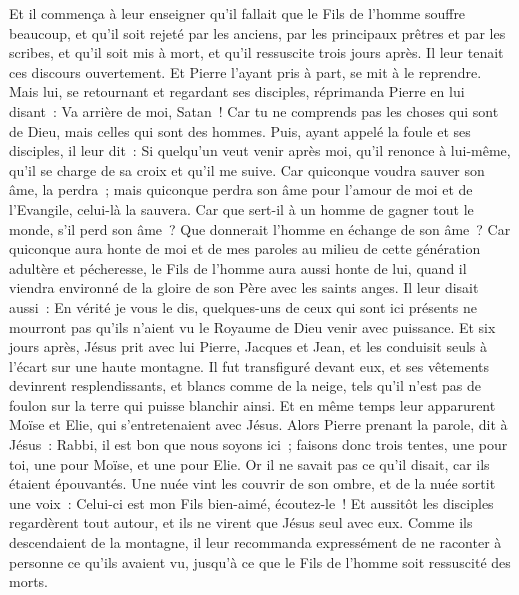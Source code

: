 \begin{multicols}{2}
Et il commença à leur enseigner qu'il fallait que le Fils de l'homme souffre beaucoup, et qu'il soit rejeté par les anciens, par les principaux prêtres et par les scribes, et qu'il soit mis à mort, et qu'il ressuscite trois jours après.
Il leur tenait ces discours ouvertement. Et Pierre l'ayant pris à part, se mit à le reprendre.
Mais lui, se retournant et regardant ses disciples, réprimanda Pierre en lui disant~: Va arrière de moi, Satan~! Car tu ne comprends pas les choses qui sont de Dieu, mais celles qui sont des hommes.
Puis, ayant appelé la foule et ses disciples, il leur dit~: Si quelqu'un veut venir après moi, qu'il renonce à lui-même, qu'il se charge de sa croix et qu'il me suive.
Car quiconque voudra sauver son âme, la perdra~; mais quiconque perdra son âme pour l'amour de moi et de l'Evangile, celui-là la sauvera.
Car que sert-il à un homme de gagner tout le monde, s'il perd son âme~?
Que donnerait l'homme en échange de son âme~?
Car quiconque aura honte de moi et de mes paroles au milieu de cette génération adultère et pécheresse, le Fils de l'homme aura aussi honte de lui, quand il viendra environné de la gloire de son Père avec les saints anges.
\VerseOne{}Il leur disait aussi~: En vérité je vous le dis, quelques-uns de ceux qui sont ici présents ne mourront pas qu'ils n'aient vu le Royaume de Dieu venir avec puissance.
Et six jours après, Jésus prit avec lui Pierre, Jacques et Jean, et les conduisit seuls à l'écart sur une haute montagne. Il fut transfiguré devant eux,
et ses vêtements devinrent resplendissants, et blancs comme de la neige, tels qu'il n'est pas de foulon sur la terre qui puisse blanchir ainsi.
Et en même temps leur apparurent Moïse et Elie, qui s'entretenaient avec Jésus.
Alors Pierre prenant la parole, dit à Jésus~: Rabbi, il est bon que nous soyons ici~; faisons donc trois tentes, une pour toi, une pour Moïse, et une pour Elie.
Or il ne savait pas ce qu'il disait, car ils étaient épouvantés.
Une nuée vint les couvrir de son ombre, et de la nuée sortit une voix~: Celui-ci est mon Fils bien-aimé, écoutez-le~!
Et aussitôt les disciples regardèrent tout autour, et ils ne virent que Jésus seul avec eux.
Comme ils descendaient de la montagne, il leur recommanda expressément de ne raconter à personne ce qu'ils avaient vu, jusqu'à ce que le Fils de l'homme soit ressuscité des morts.

\end{multicols}

